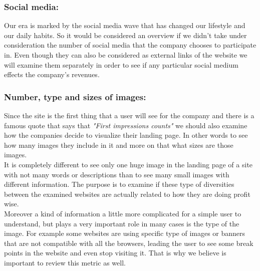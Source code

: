 \documentclass{article}
\begin{document}
\subsubsection{Social media:}Our era is marked by the social media wave that has changed our lifestyle and our daily habits. So it would be considered an overview if we didn't take under consideration the number of social media that the company chooses to participate in. Even though they can also be considered as external links of the website we will examine them separately in order to see if any particular social medium effects the company's revenues.
\subsubsection{Number, type and sizes of images:}Since the site is the first thing that a user will see for the company and there is a famous quote that says that \textit{"First impressions counts"} we should also examine how the companies decide to visualize their landing page. In other words to see how many images they include in it and more on that what sizes are those images.\\ It is completely different to see only one huge image in the landing page of a site with not many words or descriptions than to see many small images with different information. The purpose is to examine if these type of diversities between the examined websites are actually related to how they are doing profit wise.\\ Moreover a kind of information a little more complicated for a simple user to understand, but plays a very important role in many cases is the type of the image. For example some websites are using specific type of images or banners that are not compatible with all the browsers, leading the user to see some break points in the website and even stop visiting it. That is why we believe is important to review this metric as well.
\end{document}
